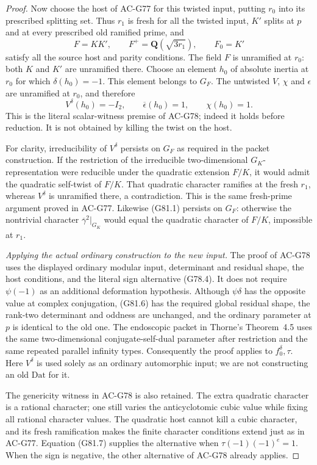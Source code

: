\begin{proof}
Now choose the host of AC-G77 for this twisted input, putting
\(r_0\) into its prescribed splitting set.
Thus \(r_1\) is fresh for all the twisted input, \(K'\) splits
at \(p\) and at every prescribed old ramified prime, and
\[
 F=KK',\qquad F^+=\mathbf Q(\sqrt{3r_1}),\qquad F_0=K'
\]
satisfy all the source host and parity conditions.
The field \(F\) is unramified at \(r_0\): both \(K\) and \(K'\)
are unramified there.  Choose an element \(h_0\) of absolute
inertia at \(r_0\) for which \(\delta(h_0)=-1\).
This element belongs to \(G_F\).  The untwisted \(V\), \(\chi\)
and \(\epsilon\) are unramified at \(r_0\), and therefore
\[
       V^\delta(h_0)=-I_2,\qquad
       \overline\epsilon(h_0)=1,\qquad
       \chi(h_0)=1.                               \tag{G81.7}
\]
This is the literal scalar-witness premise of AC-G78; indeed it
holds before reduction.  It is not obtained by killing the
twist on the host.

For clarity, irreducibility of \(V^\delta\) persists on \(G_F\)
as required in the packet construction.  If the restriction
of the irreducible two-dimensional \(G_K\)-representation
were reducible under the quadratic extension \(F/K\), it would
admit the quadratic self-twist of \(F/K\).
That quadratic character ramifies at the fresh \(r_1\), whereas
\(V^\delta\) is unramified there, a contradiction.
This is the same fresh-prime argument proved in AC-G77.
Likewise (G81.1) persists on \(G_F\): otherwise the nontrivial
character \(\overline\gamma^2|_{G_K}\) would equal the quadratic
character of \(F/K\), impossible at \(r_1\).

\emph{Applying the actual ordinary construction to the new input.}
The proof of AC-G78 uses the displayed ordinary modular input,
determinant and residual shape, the host conditions, and the
literal sign alternative (G78.4).
It does not require \(\psi(-1)\) as an additional deformation
hypothesis.  Although \(\psi\delta\) has the opposite value at
complex conjugation, (G81.6) has the required global residual
shape, the rank-two determinant and oddness are unchanged,
and the ordinary parameter at \(p\) is identical to the old
one.  The endoscopic packet in Thorne's Theorem~4.5 uses the
same two-dimensional conjugate-self-dual parameter after
restriction and the same repeated parallel infinity types.
Consequently the proof applies to \(f_0^\delta,\tau\).
Here \(V^\delta\) is used solely as an ordinary automorphic
input; we are not constructing an old \(\mathrm{Dat}\) for it.

The genericity witness in AC-G78 is also retained.
The extra quadratic character is a rational character; one
still varies the anticyclotomic cubic value while fixing all
rational character values.  The quadratic host cannot kill a
cubic character, and its fresh ramification makes the finite
character conditions extend just as in AC-G77.
Equation (G81.7) supplies the alternative when
\(\tau(-1)(-1)^e=1\).  When the sign is negative, the other
alternative of AC-G78 already applies.


\end{proof}
